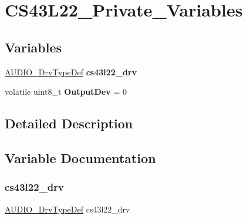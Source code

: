 \hypertarget{group___c_s43_l22___private___variables}{}\section{C\+S43\+L22\+\_\+\+Private\+\_\+\+Variables}
\label{group___c_s43_l22___private___variables}
\subsection*{Variables}
\begin{DoxyCompactItemize}
\item 
\mbox{\hyperlink{struct_a_u_d_i_o___drv_type_def}{A\+U\+D\+I\+O\+\_\+\+Drv\+Type\+Def}} {\bfseries cs43l22\+\_\+drv}
\item 
\mbox{\label{group___c_s43_l22___private___variables_ga25562d7df26324014c7d767ea1ec80f2}} 
volatile uint8\+\_\+t {\bfseries Output\+Dev} = 0
\end{DoxyCompactItemize}


\subsection{Detailed Description}


\subsection{Variable Documentation}
\mbox{\label{group___c_s43_l22___private___variables_gaeefb43f26352ff4df610fd8bca1b279d}} 
\subsubsection{\texorpdfstring{cs43l22\+\_\+drv}{cs43l22\_drv}}
{\footnotesize\ttfamily \mbox{\hyperlink{struct_a_u_d_i_o___drv_type_def}{A\+U\+D\+I\+O\+\_\+\+Drv\+Type\+Def}} cs43l22\+\_\+drv}

